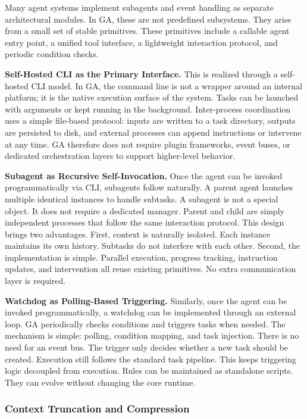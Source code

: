 Many agent systems implement subagents and event handling as separate architectural modules. 
In GA, these are not predefined subsystems.  
They arise from a small set of stable primitives. These primitives include a callable agent entry point, a unified tool interface, a lightweight interaction protocol, and periodic condition checks.

\textbf{Self-Hosted CLI as the Primary Interface.}
This is realized through a self-hosted CLI model. In GA, the command line is not a wrapper around an internal platform; it is the native execution surface of the system. Tasks can be launched with arguments or kept running in the background. Inter-process coordination uses a simple file-based protocol: inputs are written to a task directory, outputs are persisted to disk, and external processes can append instructions or intervene at any time. GA therefore does not require plugin frameworks, event buses, or dedicated orchestration layers to support higher-level behavior. 

\textbf{Subagent as Recursive Self-Invocation.}
Once the agent can be invoked programmatically via CLI, subagents follow naturally. 
A parent agent launches multiple identical instances to handle subtasks.
A subagent is not a special object. It does not require a dedicated manager. 
Parent and child are simply independent processes that follow the same interaction protocol.
This design brings two advantages. 
First, context is naturally isolated. Each instance maintains its own history. 
Subtasks do not interfere with each other. 
Second, the implementation is simple. Parallel execution, progress tracking, instruction updates, and intervention all reuse existing primitives. No extra communication layer is required.

\textbf{Watchdog as Polling-Based Triggering.}
Similarly, once the agent can be invoked programmatically, a watchdog can be implemented through an external loop. 
GA periodically checks conditions and triggers tasks when needed. 
The mechanism is simple: polling, condition mapping, and task injection.
There is no need for an event bus. 
The trigger only decides whether a new task should be created. 
Execution still follows the standard task pipeline. 
This keeps triggering logic decoupled from execution. 
Rules can be maintained as standalone scripts. They can evolve without changing the core runtime.

\subsubsection{Context Truncation and Compression}
\label{sec:context-truncation}


